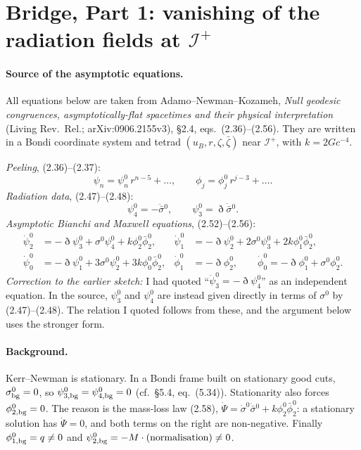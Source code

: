 \documentclass[11pt]{article}
\begin{document}
\section*{Bridge, Part 1: vanishing of the radiation fields at $\mathcal I^+$}

\paragraph{Source of the asymptotic equations.} All equations below are taken from Adamo--Newman--Kozameh, \emph{Null geodesic congruences, asymptotically-flat spacetimes and their physical interpretation} (Living Rev.\ Rel.; arXiv:0906.2155v3), \S2.4, eqs.\ (2.36)--(2.56). They are written in a Bondi coordinate system and tetrad $(u_B,r,\zeta,\bar\zeta)$ near $\mathcal I^+$, with $k=2Gc^{-4}$.

\emph{Peeling}, (2.36)--(2.37):
\[
\psi_n=\psi_n^0\,r^{n-5}+\dots,\qquad \phi_j=\phi_j^0\,r^{j-3}+\dots .
\]
\emph{Radiation data}, (2.47)--(2.48):
\[
\psi_4^0=-\ddot{\bar\sigma}{}^0,\qquad \psi_3^0=\eth\dot{\bar\sigma}{}^0 .
\]
\emph{Asymptotic Bianchi and Maxwell equations}, (2.52)--(2.56):
\begin{align*}
\dot\psi_2^0&=-\eth\psi_3^0+\sigma^0\psi_4^0+k\phi_2^0\bar\phi_2^0, &
\dot\psi_1^0&=-\eth\psi_2^0+2\sigma^0\psi_3^0+2k\phi_1^0\bar\phi_2^0,\\
\dot\psi_0^0&=-\eth\psi_1^0+3\sigma^0\psi_2^0+3k\phi_0^0\bar\phi_2^0, &
\dot\phi_1^0&=-\eth\phi_2^0,\qquad \dot\phi_0^0=-\eth\phi_1^0+\sigma^0\phi_2^0 .
\end{align*}
\emph{Correction to the earlier sketch:} I had quoted ``$\dot\psi_3^0=-\eth\psi_4^0$'' as an independent equation. In the source, $\psi_3^0$ and $\psi_4^0$ are instead given directly in terms of $\sigma^0$ by (2.47)--(2.48). The relation I quoted follows from these, and the argument below uses the stronger form.

\paragraph{Background.} Kerr--Newman is stationary. In a Bondi frame built on stationary good cuts, $\sigma^0_{\rm bg}=0$, so $\psi^0_{3,\rm bg}=\psi^0_{4,\rm bg}=0$ (cf.\ \S5.4, eq.\ (5.34)). Stationarity also forces $\phi^0_{2,\rm bg}=0$. The reason is the mass-loss law (2.58), $\dot\Psi=\dot\sigma^0\dot{\bar\sigma}{}^0+k\phi_2^0\bar\phi_2^0$: a stationary solution has $\dot\Psi=0$, and both terms on the right are non-negative. Finally $\phi^0_{1,\rm bg}=q\neq0$ and $\psi^0_{2,\rm bg}=-M\cdot(\text{normalisation})\neq0$.
\end{document}
